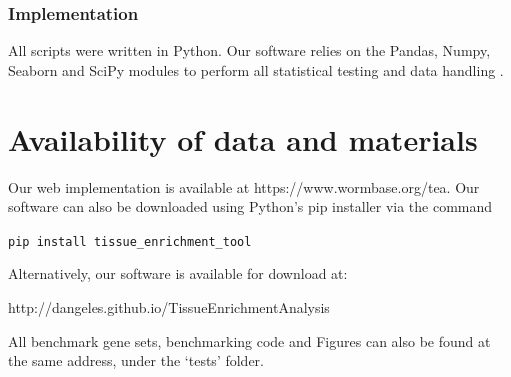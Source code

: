 \documentclass[linenumbers, doublespacing]{bmcart}
\begin{document}
\subsubsection*{Implementation}
All scripts were written in Python. Our software relies on the Pandas, Numpy, Seaborn and SciPy modules to perform all statistical testing and data handling \cite{McKinney2011, VanDerWalt2011, Oliphant2007}.


\section*{Availability of data and materials}
Our web implementation is available at https://www.wormbase.org/tea. Our software can also be downloaded using Python's pip installer via the command

\texttt{pip install tissue\_enrichment\_tool}

Alternatively, our software is available for download at:

http://dangeles.github.io/TissueEnrichmentAnalysis

All benchmark gene sets, benchmarking code and Figures can also be found at the same address, under the `tests' folder.
\end{document}
